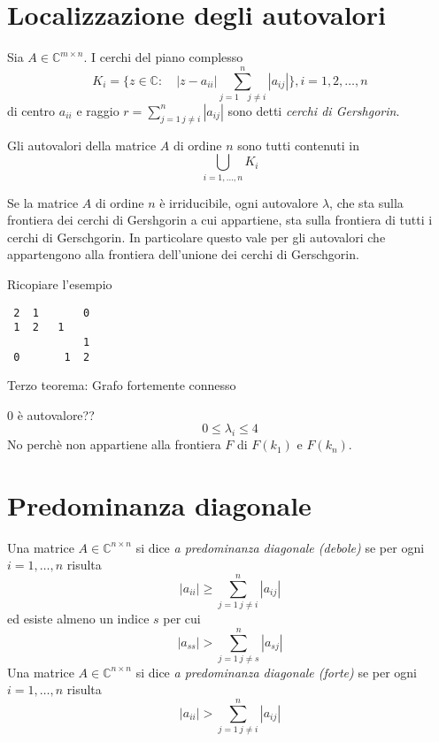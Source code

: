 \section{Localizzazione degli autovalori}
\begin{defn}
Sia $A \in \mathbb{C}^{m \times n}$. I cerchi del piano complesso
 $$K_i = \{ z \in \mathbb{C} :  \quad  |z -  a_{ii}| 
\displaystyle \sum_{j=1 \quad j\neq i}^{n} |a_{ij}| \}, i = 1,2, \ldots, n
$$ 
di centro $a_{ii}$ e raggio $r= \displaystyle\sum_{j=1 ~ j\neq i}^{n} |a_{ij}|$ 
sono detti \emph{cerchi di Gershgorin}.
\end{defn}



\begin{theo}
Gli autovalori della matrice $A$ di ordine $n$ sono tutti contenuti in
$$ \displaystyle \bigcup_{i= 1, \ldots, n} K_{i}$$
\end{theo}


\begin{theo}
Se la matrice $A$ di ordine $n$ \`e irriducibile, ogni autovalore $\lambda$,
che sta sulla frontiera dei cerchi di Gershgorin a cui appartiene, sta sulla
frontiera di tutti i cerchi di Gerschgorin. In particolare questo
vale per gli autovalori che appartengono alla frontiera dell'unione dei cerchi
di Gerschgorin.
\end{theo}

\begin{example}
\begin{notes}
 Ricopiare l'esempio
\end{notes}

\begin{Verbatim}
 2  1       0
 1  2   1   
            1  
 0       1  2
\end{Verbatim}

Terzo teorema: Grafo fortemente connesso

0 \`e autovalore??
$$ 0 \leq \lambda_i \leq 4 $$
No perch\`e non appartiene alla frontiera $F$  di 
$F(k_1)$ e $F(k_n)$.
\end{example}

\section{Predominanza diagonale}

\begin{defn}
Una matrice $A \in \mathbb{C}^{n \times n}$ si dice
\emph{a predominanza diagonale (debole)} se per ogni $i=1, \ldots ,n$ risulta
$$ |a_{ii}|  \geq \displaystyle \sum_{j=1~ j \neq i}^n  | a_{ij} | $$
ed esiste almeno un indice $s$ per cui
$$ |a_{ss}| > \displaystyle \sum_{j=1 ~ j \neq s}^{n} |a_{sj}|$$
Una matrice $A \in \mathbb{C}^{n \times n}$ si dice
\emph{a predominanza diagonale (forte)} se per ogni $i=1, \ldots ,n$ risulta
$$ |a_{ii}|  > \displaystyle \sum_{j=1~ j \neq i}^n  | a_{ij} | $$
\end{defn}

